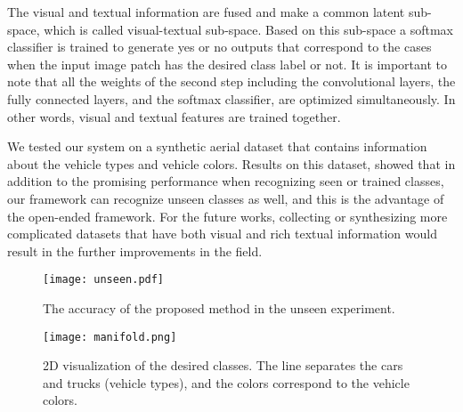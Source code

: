 \documentclass[conference]{IEEEtran}
\begin{document}
The visual and textual information are fused and make a common latent sub-space, which is called visual-textual sub-space. Based on this sub-space a softmax classifier is trained to generate yes or no outputs that correspond to the cases when the input image patch has the desired class label or not. It is important to note that all the weights of the second step including the convolutional layers, the fully connected layers, and the softmax classifier, are optimized simultaneously. In other words, visual and textual features are trained together.


We tested our system on a synthetic aerial dataset that contains information about the vehicle types and vehicle colors. Results on this dataset, showed that in addition to the promising performance when recognizing seen or trained classes, our framework can recognize unseen classes as well, and this is the advantage of the open-ended framework. For the future works, collecting or synthesizing more complicated datasets that have both visual and rich textual information would result in the further improvements in the field. \\

\begin{figure}[!t]
\centering
\texttt{[image: unseen.pdf]}
\caption{The accuracy of the proposed method in the unseen experiment.}
\label{fig_graph5}
\end{figure}

\begin{figure}[t]
\centering
\texttt{[image: manifold.png]}
\caption{2D visualization of the desired classes. The line separates the cars and trucks (vehicle types), and the colors correspond to the vehicle colors.}
\label{fig_graph9}
\end{figure}







\end{document}
